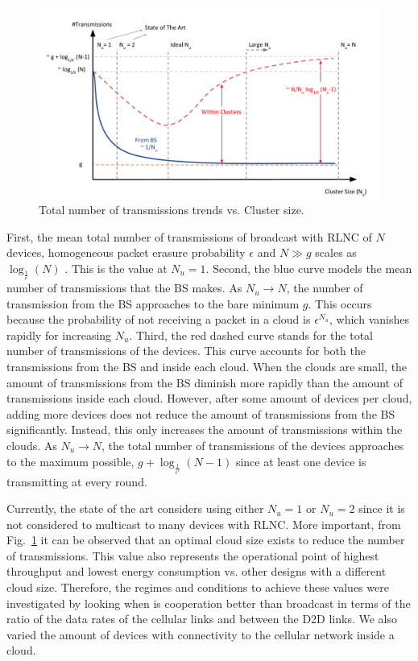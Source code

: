 \begin{figure}[h]
  \centering
  \includegraphics[width=\textwidth]{introduction/figures/cloud_sizes.pdf}
  \caption{Total number of transmissions trends vs. Cluster size.}
\label{fig:cloud_sizes}
\end{figure}

First, the mean total number of transmissions of broadcast with \ac{RLNC} of $N$ devices, homogeneous packet erasure probability $\epsilon$ and $N \gg g$ scales as $\log_{\frac{1}{\epsilon}}(N)$ \cite{eryilmaz2008delay}. This is the value at $N_u = 1$. Second, the blue curve models the mean number of transmissions that the \ac{BS} makes. As $N_u \rightarrow N$, the number of transmission from the \ac{BS} approaches to the bare minimum $g$. This occurs because the probability of not receiving a packet in a cloud is ${\epsilon}^{N_u}$, which vanishes rapidly for increasing $N_u$. Third, the red dashed curve stands for the total number of transmissions of the devices. This curve accounts for both the transmissions from the \ac{BS} and inside each cloud. When the clouds are small, the amount of transmissions from the \ac{BS} diminish more rapidly than the amount of transmissions inside each cloud. However, after some amount of devices per cloud, adding more devices does not reduce the amount of transmissions from the \ac{BS} significantly. Instead, this only increases the amount of transmissions within the clouds. As $N_u \rightarrow N$, the total number of transmissions of the devices approaches to the maximum possible, $ g + \log_{\frac{1}{\epsilon'}}(N - 1)$ since at least one device is transmitting at every round.

Currently, the state of the art considers using either $N_u = 1$ or $N_u = 2$ since it is not considered to multicast to many devices with \ac{RLNC}. More important, from Fig.~\ref{fig:cloud_sizes} it can be observed that an optimal cloud size exists to reduce the number of transmissions. This value also represents the operational point of highest throughput and lowest energy consumption vs. other designs with a different cloud size. Therefore, the regimes and conditions to achieve these values were investigated by looking when is cooperation better than broadcast in terms of the ratio of the data rates of the cellular links and between the \ac{D2D} links. We also varied the amount of devices with connectivity to the cellular network inside a cloud.

